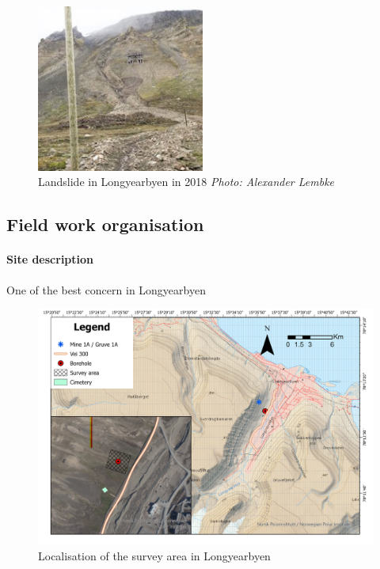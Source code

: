 \begin{figure}
    \centering
    \includegraphics[width=5.5cm]{Images/00_Methodology/LandSlide2018.jpg}
    \caption{Landslide in Longyearbyen in 2018 \emph{Photo: Alexander Lembke} \cite{Landslide2018Longyeabyen}}
    \label{fig:Landslide2018}
\end{figure}

\subsection{Field work organisation}


\paragraph{Site description} \label{Paragraph:SiteDescription}

One of the best concern in Longyearbyen 




\begin{figure}
    \centering
    \includegraphics[width=\linewidth]{Images/00_Methodology/GeographicSituation.jpg}
    \caption{Localisation of the survey area in Longyearbyen}
    \label{fig:Location}
\end{figure}


